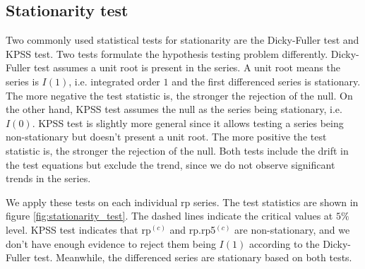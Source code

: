 \begin{refsection}

\section{Stationarity test}
\label{sec:stationarity_test}
Two commonly used statistical tests for stationarity are the Dicky-Fuller test\supercite{dickey1979distribution} and KPSS test\supercite{kwiatkowski1992testing}. Two tests formulate the hypothesis testing problem differently. Dicky-Fuller test assumes a unit root is present in the series. A unit root means the series is $I(1)$, i.e. integrated order $1$ and the first differenced series is stationary. The more negative the test statistic is, the stronger the rejection of the null. On the other hand, KPSS test assumes the null as the series being stationary, i.e. $I(0)$. KPSS test is slightly more general since it allows testing a series being non-stationary but doesn't present a unit root. The more positive the test statistic is, the stronger the rejection of the null. Both tests include the drift in the test equations but exclude the trend, since we do not observe significant trends in the series. 

We apply these tests on each individual rp series. The test statistics are shown in figure \ref{fig:stationarity_test}. The dashed lines indicate the critical values at $5 \%$ level. KPSS test indicates that rp$^{(c)}$ and rp.rp5$^{(c)}$ are non-stationary, and we don't have enough evidence to reject them being $I(1)$ according to the Dicky-Fuller test. Meanwhile, the differenced series are stationary based on both tests.


\end{refsection}
